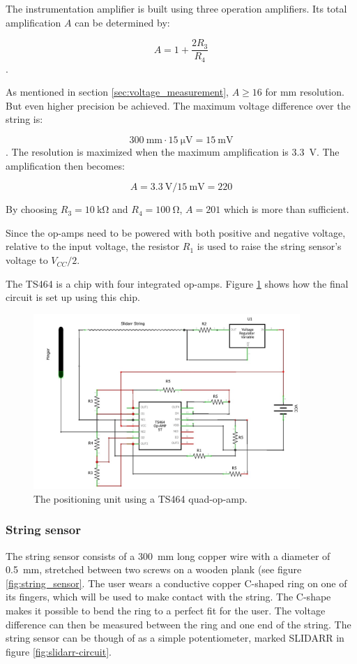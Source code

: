\documentclass{article}
\begin{document}
The instrumentation amplifier is built using three operation amplifiers. Its total amplification $A$ can be determined by:

$$ A = 1 + \frac{2R_3}{R_4} $$. 

As mentioned in section \ref{sec:voltage_measurement}, $ A \geq 16 $ for \si{\milli\meter} resolution. But even higher precision be achieved. The maximum voltage difference over the string is:

$$\SI{300}{\milli\meter} \cdot \SI{15}{\micro\volt}= \SI{15}{\milli\volt} $$. 
The resolution is maximized when the maximum amplification is \SI{3.3}{\volt}. The amplification then becomes:

$$ A = \SI{3.3}{\volt} / \SI{15}{\milli\volt} = 220 $$ 

By choosing $R_3 = \SI{10}{\kilo\ohm} $ and $R_4 = \SI{100}{\ohm} $, $ A = 201 $ which is more than sufficient.

Since the op-amps need to be powered with both positive and negative voltage, relative to the input voltage, the resistor $R_1$ is used to raise the string sensor's voltage to $V_{CC}/2$.

The TS464 is a chip with four integrated op-amps. Figure \ref{fig:slidarr-circuit2} shows how the final circuit is set up using this chip.

\begin{figure}[h]
  \centering
  \includegraphics[width=0.9\textwidth]{slidarr-circuit2}
  \caption{The positioning unit using a TS464 quad-op-amp.}
  \label{fig:slidarr-circuit2}
\end{figure}

\subsubsection{String sensor}
The string sensor consists of a \SI{300}{\milli\meter} long copper wire with a diameter of \SI{0.5}{\milli\meter}, stretched between two screws on a wooden plank (see figure \ref{fig:string_sensor}.  The user wears a conductive copper C-shaped ring on one of its fingers, which will be used to make contact with the string. The C-shape makes it possible to bend the ring to a perfect fit for the user. The voltage difference can then be measured between the ring and one end of the string. The string sensor can be though of as a simple potentiometer, marked SLIDARR in figure \ref{fig:slidarr-circuit}.
\end{document}
